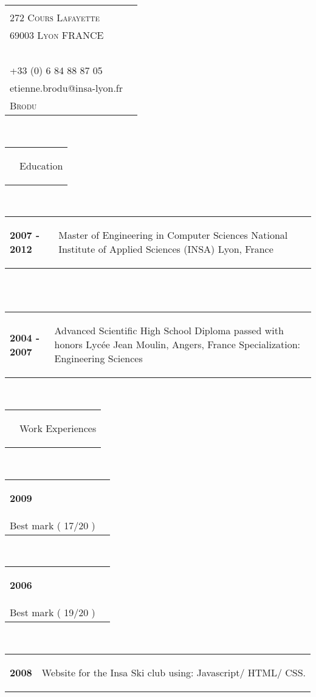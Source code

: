 \documentclass[a4paper,11.5pt]{article}
\makeatletter
\newlength{\bottomMarginHeader}
\newlength{\topMarginSection}
\newlength{\bottomMarginSection}
\newlength{\tabularVSpace}
\newcommand{\mycolor}[1]{
	\textcolor[RGB]{59,134,254}{#1}
}
\newcommand{\rmp}[1]{
	\begin{minipage}[t]{5cm}
		\begin{flushright}
			#1
		\end{flushright}
	\end{minipage}	
}
\newcommand{\lmp}[1]{
	\begin{minipage}[t]{13cm}
		\begin{flushleft}
			#1
		\end{flushleft}
	\end{minipage}
}
\newcommand{\rltabvline}[2]{
	\begin{tabular}{ p{5cm} @{\hspace{\tabularVSpace}} | @{\hspace{\tabularVSpace}} p{16cm} }
	\rmp{#1} & \lmp{#2}
	\end{tabular}
}
\newcommand{\rltab}[2]{
	\begin{tabular}{ p{5cm} @{\hspace{2\tabularVSpace}} p{16cm} }
	\rmp{#1} & \lmp{#2}
	\end{tabular}
}
\newcommand{\paragraphTitle}[1]{
		\huge{\mycolor{#1}}
}
\newcommand{\header}[2]{
	\rltabvline{#1}{#2}
	\vspace{\bottomMarginHeader}\\
}
\renewcommand{\section}[1]{
	\vspace{\topMarginSection}
	\rltab{}{\paragraphTitle{#1}}
	\vspace{\bottomMarginSection}\\
}
\renewcommand{\subsection}[2]{
	\rltab{\textbf{#1}}{#2}\\
}
\makeatother
\begin{document}
\pagestyle{empty}

\header{
		\mycolor{address} \\
		272 \textsc{Cours Lafayette} \\
		69003 \textsc{Lyon FRANCE}\\~\\
		+33 (0) 6 84 88 87 05\\
		etienne.brodu@insa-lyon.fr
	}
	{
		\LARGE{\textsc{Etienne}\\
				\textsc{Brodu}}
	}
	
\section{Education}
\subsection{2007 - 2012}
			{Master of Engineering in Computer Sciences National Institute of Applied Sciences (INSA) Lyon, France}\\

\subsection{2004 - 2007}
			{Advanced Scientific High School Diploma passed with honors Lyc\'{e}e Jean Moulin, Angers, France Specialization: Engineering Sciences}

\section{Work Experiences}
\subsection{2009}
			{Second year Project: An accurate gravitational model using: Lazarus/Pascal, OpenGL.\\ Best mark ( 17/20 )}
\subsection{2006}
			{High School Project: Clock using the retinal persistence Jury presentation.\\ Best mark ( 19/20 )}

\subsection{2008}
			{Website for the Insa Ski club using: Javascript/ HTML/ CSS.}
			
\end{document}
